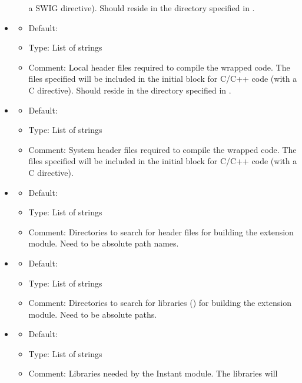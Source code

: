 \begin{itemize}
\begin{itemize}
      a SWIG directive). Should reside in the directory specified in
      .
  \end{itemize}
\item {}
  \begin{itemize}
    \item Default: \emp{[]}
    \item Type: List of strings
    \item Comment: Local header files required to compile the wrapped
      code. The files specified will be included in the initial block for C/C++ code
      (with a C directive). Should reside in the directory specified in
      .
  \end{itemize}
\item {}
  \begin{itemize}
    \item Default: \emp{[]}
    \item Type: List of strings
    \item Comment: System header files required to compile the wrapped
      code. The files specified will be included in the initial block for C/C++
      code (with a C directive).
  \end{itemize}
\item {}
  \begin{itemize}
    \item Default: \emp{[]}
    \item Type: List of strings
    \item Comment: Directories to search for header files for building the
      extension module. Need to be absolute path names.
  \end{itemize}
\item {}
  \begin{itemize}
    \item Default: \emp{[]}
    \item Type: List of strings
    \item Comment: Directories to search for libraries () for building
      the extension module. Need to be absolute paths.
  \end{itemize}
\item {}
  \begin{itemize}
    \item Default: \emp{[]}
    \item Type: List of strings
    \item Comment: Libraries needed by the Instant module. The libraries will

\end{itemize}
\end{itemize}
